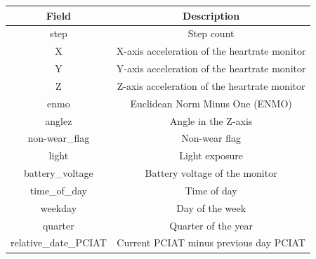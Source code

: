 \documentclass[11pt]{extarticle}
\begin{document}
\begin{table}[h!]
    \centering
    \begin{tabular}{|c|c|}
    \hline
    \textbf{Field} & \textbf{Description} \\
    \hline
    step & Step count \\
    X & X-axis acceleration of the heartrate monitor \\
    Y & Y-axis acceleration of the heartrate monitor \\
    Z & Z-axis acceleration of the heartrate monitor \\
    enmo & Euclidean Norm Minus One (ENMO) \\
    anglez & Angle in the Z-axis \\
    non-wear\_flag & Non-wear flag \\
    light & Light exposure \\
    battery\_voltage & Battery voltage of the monitor \\
    time\_of\_day & Time of day \\
    weekday & Day of the week \\
    quarter & Quarter of the year \\
    relative\_date\_PCIAT & Current PCIAT minus previous day PCIAT \\
    \hline
    \end{tabular}
    \label{table:fields}
\end{table}

\pagebreak
\end{document}
